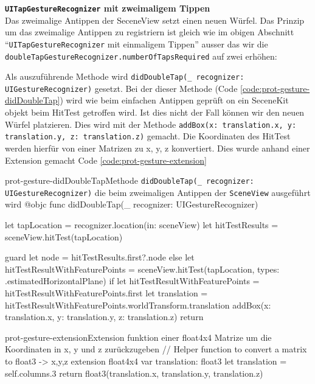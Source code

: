 \begin{description}
    \textbf{\texttt{UITapGestureRecognizer} mit zweimaligem Tippen}\\
    Das zweimalige Antippen der SeceneView setzt einen neuen Würfel. Das Prinzip um das zweimalige Antippen zu registriern ist gleich wie im obigen Abschnitt "`\texttt{UITapGestureRecognizer} mit einmaligem Tippen"' ausser das wir die \texttt{doubleTapGestureRecognizer.numberOfTapsRequired} auf zwei erhöhen:

    Als auszuführende Methode wird \texttt{didDoubleTap(\_ recognizer: UIGestureRecognizer)} gesetzt. Bei der dieser Methode (Code \ref{code:prot-gesture-didDoubleTap}) wird wie beim einfachen Antippen geprüft on ein SeceneKit objekt beim HitTest getroffen wird. Ist dies nicht der Fall können wir den neuen Würfel platzieren. Dies wird mit der Methode \texttt{addBox(x: translation.x, y: translation.y, z: translation.z)} gemacht. Die Koordinaten des HitTest werden hierfür von einer Matrizen zu x, y, z konvertiert. Dies wurde anhand einer Extension gemacht Code \ref{code:prot-gesture-extension}

    \begin{code}{prot-gesture-didDoubleTap}{Methode \texttt{didDoubleTap(\_ recognizer: UIGestureRecognizer)} die beim zweimaligen Antippen der \texttt{SceneView} ausgeführt wird}
    @objc
    func didDoubleTap(_ recognizer: UIGestureRecognizer) {
        let tapLocation = recognizer.location(in: sceneView)
        let hitTestResults = sceneView.hitTest(tapLocation)
        
        guard let node = hitTestResults.first?.node else {
            let hitTestResultWithFeaturePoints = sceneView.hitTest(tapLocation, types: .estimatedHorizontalPlane)
            if let hitTestResultWithFeaturePoints = hitTestResultWithFeaturePoints.first {
                let translation = hitTestResultWithFeaturePoints.worldTransform.translation
                addBox(x: translation.x, y: translation.y, z: translation.z)
            }
            return
        }
    }
    \end{code}

    \begin{code}{prot-gesture-extension}{Extension funktion einer float4x4 Matrize um die Koordinaten in x, y und z zurückzugeben}
    // Helper function to convert a matrix to float3 -> x,y,z
    extension float4x4 {
        var translation: float3 {
            let translation = self.columns.3
            return float3(translation.x, translation.y, translation.z)
        }
    }
    \end{code}


\end{description}
